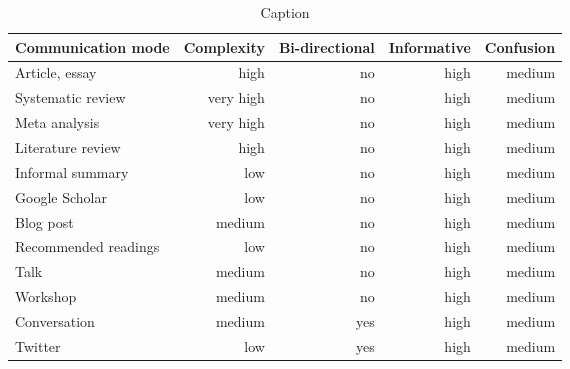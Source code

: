 \begin{table*}\centering
{}
\begin{tabular}{@{}lrrrr@{}}\toprule
Communication mode & Complexity & Bi-directional & Informative  & Confusion
\\\midrule
Article, essay      & high & no & high & medium  \\
Systematic review   & very high & no & high & medium\\
Meta analysis       & very high & no & high & medium\\
Literature review   & high & no & high & medium\\
Informal summary    & low & no & high & medium\\
Google Scholar      & low & no & high & medium\\
Blog post           & medium & no & high & medium\\
Recommended readings& low & no & high & medium\\
Talk                & medium & no & high & medium\\
Workshop            & medium & no & high & medium\\
Conversation        & medium & yes & high & medium\\
Twitter             & low       & yes & high & medium\\
\bottomrule
\end{tabular}
\caption{Caption}
\end{table*}